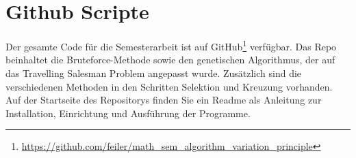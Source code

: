 %
%
%
%
\section{Github Scripte
\label{buch:paper:varalg:section:github_scripte}}

Der gesamte Code für die Semesterarbeit ist auf GitHub\footnote{
    \url{https://github.com/feiler/math_sem_algorithm_variation_principle}
    }
\cite{algorythm:repo} verfügbar. Das Repo beinhaltet die Bruteforce-Methode sowie
den genetischen Algorithmus, der auf das Travelling Salesman Problem angepasst wurde. Zusätzlich
sind die verschiedenen Methoden in den Schritten Selektion und Kreuzung vorhanden.
Auf der Startseite des Repositorys finden Sie ein Readme als Anleitung zur 
Installation, Einrichtung und Ausführung der Programme.